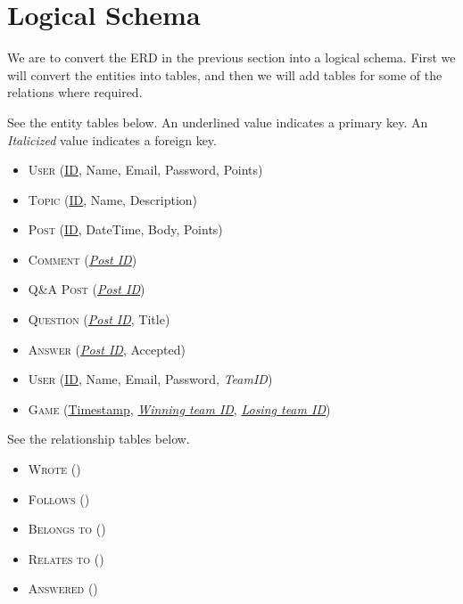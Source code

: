 \newcommand{\key}[1]{\underline{#1}}
\newcommand{\fkey}[1]{\textit{#1}}

\section{Logical Schema}

We are to convert the ERD in the previous section into a logical schema. First we will convert the entities into tables, and then we will add tables for some of the relations where required.

See the entity tables below. An underlined value indicates a primary key. An \emph{Italicized} value indicates a foreign key.

\begin{itemize}
    \item[] \textsc{User} (\key{ID}, Name, Email, Password, Points)
    \item[] \textsc{Topic} (\key{ID}, Name, Description)
    \item[] \textsc{Post} (\key{ID}, DateTime, Body, Points)
    \item[] \textsc{Comment} (\key{\fkey{Post ID}})
    \item[] \textsc{Q\&A Post} (\key{\fkey{Post ID}})
    \item[] \textsc{Question} (\key{\fkey{Post ID}}, Title)
    \item[] \textsc{Answer} (\key{\fkey{Post ID}}, Accepted)
    \item[] \textsc{User} (\key{ID}, Name, Email, Password, \fkey{TeamID})
    \item[] \textsc{Game} (\key{Timestamp}, \key{\fkey{Winning team ID}}, \key{\fkey{Losing team ID}})
\end{itemize}

See the relationship tables below.

\begin{itemize}
    \item[] \textsc{Wrote} ()
    \item[] \textsc{Follows} ()
    \item[] \textsc{Belongs to} ()
    \item[] \textsc{Relates to} ()
    \item[] \textsc{Answered} ()
\end{itemize}